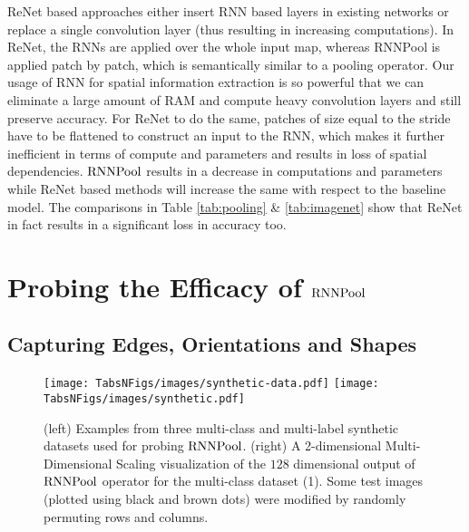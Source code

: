 \documentclass[10pt]{article}
\newcommand{\rpool}{\ensuremath{{\rm RNNPool}}\xspace}
\begin{document}
ReNet based approaches either insert RNN based layers in existing
networks or replace a single convolution layer (thus resulting in
increasing computations). In ReNet, the RNNs are applied over the
whole input map, whereas RNNPool is applied patch by patch, which is
semantically similar to a pooling operator. Our usage of RNN for
spatial information extraction is so powerful that we can eliminate a
large amount of RAM and compute heavy convolution layers and still
preserve accuracy. For ReNet to do the same, patches of size equal to
the stride have to be flattened to construct an input to the RNN,
which makes it further inefficient in terms of compute and parameters
and results in loss of spatial dependencies. \rpool results in a
decrease in computations and parameters while ReNet based methods will
increase the same with respect to the baseline model. The comparisons
in Table \ref{tab:pooling} \& \ref{tab:imagenet} show that ReNet in
fact results in a significant loss in accuracy too.
 \section{Probing the Efficacy of \rpool}
\subsection{Capturing Edges, Orientations and Shapes}
\label{sec:edges}


\begin{figure}[t]
    \centering
    \texttt{[image: TabsNFigs/images/synthetic-data.pdf]}\qquad
    \texttt{[image: TabsNFigs/images/synthetic.pdf]}\caption{(left) Examples from three multi-class and multi-label
      synthetic datasets used for probing \rpool. (right) A
      2-dimensional Multi-Dimensional Scaling visualization of the
      $128$ dimensional output of \rpool operator for the multi-class
      dataset (1). Some test images (plotted using black and brown
      dots) were modified by randomly permuting rows and columns.}\label{fig:synthetic}\end{figure}
\end{document}

